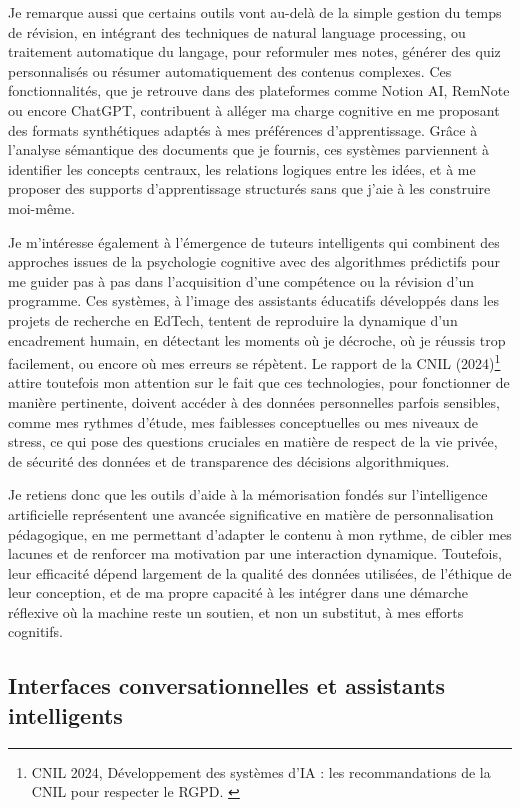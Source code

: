 \documentclass[11pt,a4paper]{report}
\begin{document}
Je remarque aussi que certains outils vont au-delà de la simple gestion du temps de révision, en intégrant des techniques de natural language processing, ou traitement automatique du langage, pour reformuler mes notes, générer des quiz personnalisés ou résumer automatiquement des contenus complexes. Ces fonctionnalités, que je retrouve dans des plateformes comme Notion AI, RemNote ou encore ChatGPT, contribuent à alléger ma charge cognitive en me proposant des formats synthétiques adaptés à mes préférences d’apprentissage. Grâce à l’analyse sémantique des documents que je fournis, ces systèmes parviennent à identifier les concepts centraux, les relations logiques entre les idées, et à me proposer des supports d’apprentissage structurés sans que j’aie à les construire moi-même.

Je m’intéresse également à l’émergence de tuteurs intelligents qui combinent des approches issues de la psychologie cognitive avec des algorithmes prédictifs pour me guider pas à pas dans l’acquisition d’une compétence ou la révision d’un programme. Ces systèmes, à l’image des assistants éducatifs développés dans les projets de recherche en EdTech, tentent de reproduire la dynamique d’un encadrement humain, en détectant les moments où je décroche, où je réussis trop facilement, ou encore où mes erreurs se répètent. Le rapport de la CNIL (2024)\footnote{CNIL 2024, Développement des systèmes d’IA : les recommandations de la CNIL pour respecter le RGPD. \cite{cnil}} attire toutefois mon attention sur le fait que ces technologies, pour fonctionner de manière pertinente, doivent accéder à des données personnelles parfois sensibles, comme mes rythmes d’étude, mes faiblesses conceptuelles ou mes niveaux de stress, ce qui pose des questions cruciales en matière de respect de la vie privée, de sécurité des données et de transparence des décisions algorithmiques.

Je retiens donc que les outils d’aide à la mémorisation fondés sur l’intelligence artificielle représentent une avancée significative en matière de personnalisation pédagogique, en me permettant d’adapter le contenu à mon rythme, de cibler mes lacunes et de renforcer ma motivation par une interaction dynamique. Toutefois, leur efficacité dépend largement de la qualité des données utilisées, de l’éthique de leur conception, et de ma propre capacité à les intégrer dans une démarche réflexive où la machine reste un soutien, et non un substitut, à mes efforts cognitifs.

\subsection{Interfaces conversationnelles et assistants intelligents}
\end{document}
